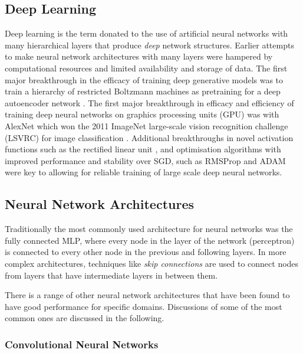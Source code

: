 \subsection{Deep Learning}

Deep learning is the term donated to the use of artificial neural networks with many hierarchical layers that produce \textit{deep} network structures. 
Earlier attempts to make neural network architectures with many layers were hampered by computational resources and limited availability and storage of data. 
The first major breakthrough in the efficacy of training deep generative models was to train a hierarchy of restricted Boltzmann machines \citep{ackley1985learning} as pretraining for a deep autoencoder network \citep{hinton2006reducing}. 
The first major breakthrough in efficacy and efficiency of training deep neural networks on graphics processing units (GPU) was with AlexNet \citep{krizhevsky2012imagenet} which won the 2011 ImageNet large-scale vision recognition challenge (LSVRC) for image classification \citep{russakovsky2015imagenet}. 
Additional breakthroughs in novel activation functions such as the rectified linear unit \citep{nair2010rectified}, and optimisation algorithms with improved performance and stability over SGD, such as RMSProp \citep{tieleman2012lecture} and ADAM \citep{kingma2015adam} were key to allowing for reliable training of large scale deep neural networks. 

\subsection{Neural Network Architectures}

Traditionally the most commonly used architecture for neural networks was the fully connected MLP, where every node in the layer of the network (perceptron) is connected to every other node in the previous and following layers. 
In more complex architectures, techniques like \textit{skip connections} are used to connect nodes from layers that have intermediate layers in between them. 

There is a range of other neural network architectures that have been found to have good performance for specific domains. 
Discussions of some of the most common ones are discussed in the following.


\subsubsection{Convolutional Neural Networks}

